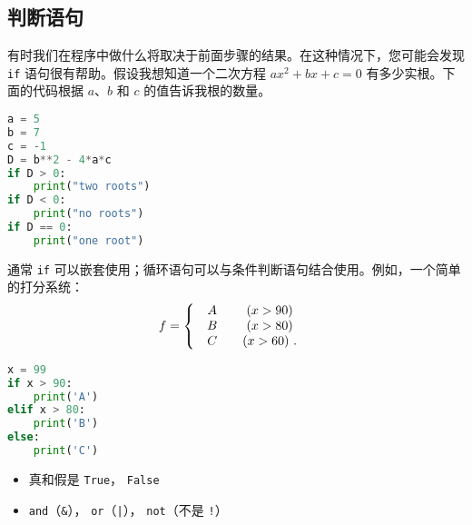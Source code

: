 
\begin{issues}
\end{issues}


\subsection{判断语句}
有时我们在程序中做什么将取决于前面步骤的结果。在这种情况下，您可能会发现 \verb|if| 语句很有帮助。假设我想知道一个二次方程 $ax^2+bx+c=0$ 有多少实根。下面的代码根据 $a$、$b$ 和 $c$ 的值告诉我根的数量。
\begin{lstlisting}[language=python]
a = 5
b = 7
c = -1 
D = b**2 - 4*a*c
if D > 0:
    print("two roots")
if D < 0:
    print("no roots")
if D == 0:
    print("one root")
\end{lstlisting}

通常 \verb|if| 可以嵌套使用；循环语句可以与条件判断语句结合使用。例如，一个简单的打分系统：
\begin{equation}
f=\left\{\begin{array}{lc}\begin{array}{c}A\\B \\C \end{array}&\begin{array}{c}
(x>90) \\
(x>80) \\
(x>60)~.\end{array}\end{array}\right.\\\\
\end{equation}
\begin{lstlisting}[language=python]
x = 99
if x > 90:
    print('A')
elif x > 80:
    print('B')
else:
    print('C')
\end{lstlisting}


\begin{itemize}
\item 真和假是 \verb|True|， \verb|False|
\item \verb|and|（\verb|&|）， \verb|or|（\verb`|`）， \verb|not|（不是 \verb|!|）
\end{itemize}


